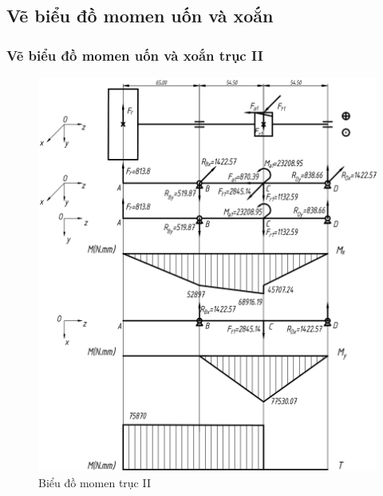         \subsection{Vẽ biểu đồ momen uốn và xoắn}
            \subsubsection{Vẽ biểu đồ momen uốn và xoắn trục II}
                \begin{figure}[H]
                    \centering
                    \includegraphics[width = 1\textwidth]{pictures/momen_II.png}
                    \caption{Biểu đồ momen trục II}
                    \label{fig:momen_II}
                \end{figure}
                \newpage
